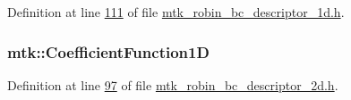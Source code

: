 Definition at line \hyperlink{mtk__robin__bc__descriptor__1d_8h_source_l00111}{111} of file \hyperlink{mtk__robin__bc__descriptor__1d_8h_source}{mtk\+\_\+robin\+\_\+bc\+\_\+descriptor\+\_\+1d.\+h}.

\hypertarget{group__c07-mim__ops_gaa79593eeb6676d6011db339e01983909}{
\subsubsection[{Coefficient\+Function1\+D}]{\setlength{\rightskip}{0pt plus 5cm}mtk\+::\+Coefficient\+Function1\+D}}\label{group__c07-mim__ops_gaa79593eeb6676d6011db339e01983909}


Definition at line \hyperlink{mtk__robin__bc__descriptor__2d_8h_source_l00097}{97} of file \hyperlink{mtk__robin__bc__descriptor__2d_8h_source}{mtk\+\_\+robin\+\_\+bc\+\_\+descriptor\+\_\+2d.\+h}.

